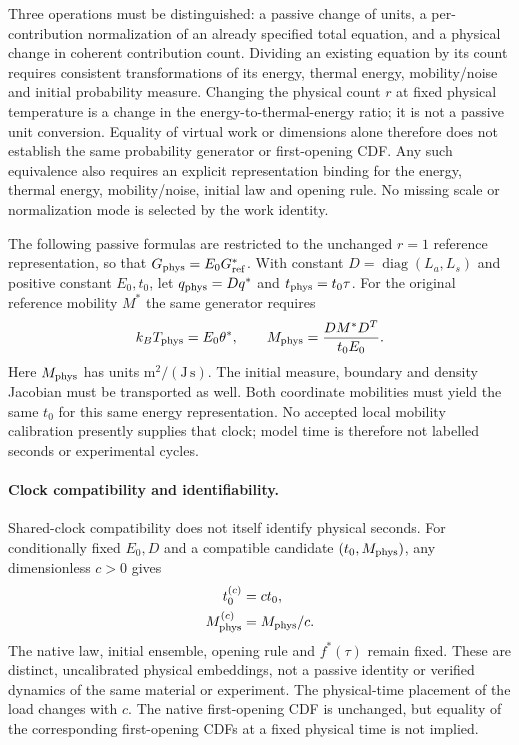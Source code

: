 \documentclass[11pt]{article}
\begin{document}
Three operations must be distinguished: a passive change of units, a
per-contribution normalization of an already specified total equation, and
a physical change in coherent contribution count.
Dividing an existing equation by its count requires consistent transformations
of its energy, thermal energy, mobility/noise and initial probability measure.
Changing the physical count $r$ at fixed physical temperature is a change
in the energy-to-thermal-energy ratio; it is not a passive unit conversion.
Equality of virtual work or dimensions alone therefore does not establish
the same probability generator or first-opening CDF. Any such equivalence
also requires an explicit representation binding for the energy, thermal
energy, mobility/noise, initial law and opening rule. No missing scale or
normalization mode is selected by the work identity.

The following passive formulas are restricted to the unchanged $r=1$
reference representation, so that $G_{\rm phys}=E_0G_{\rm ref}^*$.
With constant $D=\operatorname{diag}(L_a,L_s)$ and positive constant
$E_0,t_0$, let $q_{\rm phys}=Dq^*$ and $t_{\rm phys}=t_0\tau$.
For the original reference mobility $M^*$ the same generator requires
\begin{equation}
 k_BT_{\rm phys}=E_0\theta^*,\qquad
 M_{\rm phys}=\frac{DM^*D^T}{t_0E_0}.
\end{equation}
Here $M_{\rm phys}$ has units $\mathrm{m^2/(J\,s)}$.
The initial measure, boundary and density Jacobian must be transported as well.
Both coordinate mobilities must yield the same $t_0$ for this same energy
representation. No accepted local mobility calibration presently supplies
that clock; model time is therefore not labelled seconds or experimental cycles.

\paragraph{Clock compatibility and identifiability.}
Shared-clock compatibility does not itself identify physical seconds.
For conditionally fixed $E_0,D$ and a compatible candidate
$(t_0,M_{\rm phys})$, any dimensionless $c>0$ gives
\begin{equation}
\begin{aligned}
 t_0^{(c)}&=ct_0,\\
 M_{\rm phys}^{(c)}&=M_{\rm phys}/c .
\end{aligned}
\end{equation}
The native law, initial ensemble, opening rule and $f^*(\tau)$ remain
fixed. These are distinct, uncalibrated physical embeddings, not a
passive identity or verified dynamics of the same material or experiment.
The physical-time placement of the load changes with $c$. The native
first-opening CDF is unchanged, but equality of the corresponding
first-opening CDFs at a fixed physical time is not implied.
\end{document}
